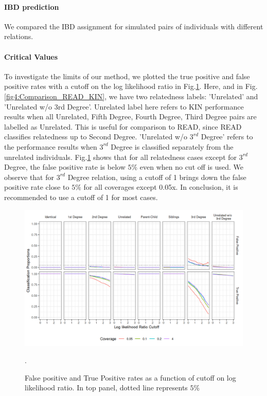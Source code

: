 \documentclass[12pt, letterpaper]{article}
\begin{document}
\paragraph{IBD prediction}
We compared the IBD assignment for simulated pairs of individuals with different relations. 

\paragraph{Critical Values}
 To investigate the limits of our method, we plotted the true positive and false positive rates with a cutoff on the log likelihood ratio in Fig.\ref{fig3:cutoff}. Here, and in Fig.\ref{fig4:Comparison_READ_KIN}, we have two relatedness labels: 'Unrelated' and 'Unrelated w/o 3rd Degree'. Unrelated label here refers to KIN performance results when all Unrelated, Fifth Degree, Fourth Degree, Third Degree pairs are labelled as Unrelated. This is useful for comparison to READ, since READ classifies relatedness up to Second Degree. 'Unrelated w/o $3^{rd}$ Degree' refers to the performance results when $3^{rd}$ Degree is classified separately from the unrelated individuals. Fig.\ref{fig3:cutoff} shows that for all relatedness cases except for $3^{rd}$ Degree, the false positive rate is below $5\%$ even when no cut off is used. We observe that for $3^{rd}$ Degree relation, using a cutoff of 1 brings down the false positive rate close to $5\%$ for all coverages except 0.05x. In conclusion, it is recommended to use a cutoff of 1 for most cases.

\begin{figure}[h!]
    \includegraphics[width=16cm]{plots/plotimg/contam0_inbred0_model_performance_allroc_asc0_plot.png}
    \centering
    \caption{False positive and True Positive rates as a function of cutoff on log likelihood ratio. In top panel, dotted line represents $5\%$}.
    \label{fig3:cutoff}
\end{figure}
\end{document}
